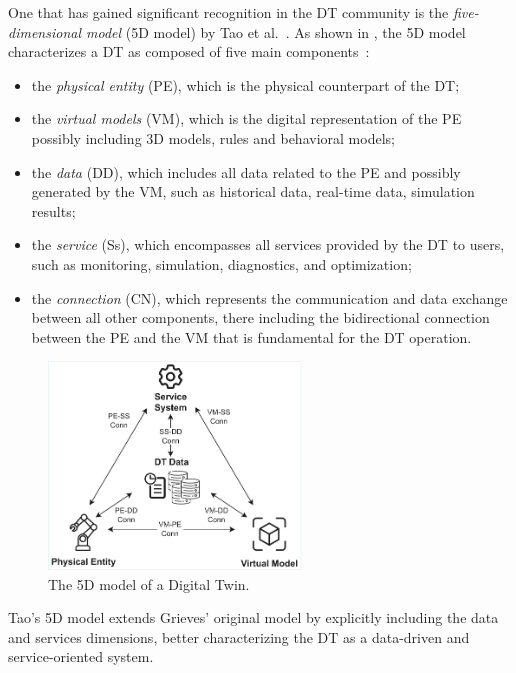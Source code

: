 One that has gained significant recognition in the \ac{DT} community is the \emph{five-dimensional model} (5D model) by Tao et al.~\cite{dt-driven-prognostics-tao-2018}.
%
As shown in , the 5D model characterizes a \ac{DT} as composed of five main components~\cite{qi2021enablingtechdt}:
\begin{itemize}
\item the \emph{physical entity} (PE), which is the physical counterpart of the \ac{DT};
\item the \emph{virtual models} (VM), which is the digital representation of the PE possibly including 3D models, rules and behavioral models;
\item the \emph{data} (DD), which includes all data related to the PE and possibly generated by the VM, such as historical data, real-time data, simulation results;
\item the \emph{service} (Ss), which encompasses all services provided by the \ac{DT} to users, such as monitoring, simulation, diagnostics, and optimization;
\item the \emph{connection} (CN), which represents the communication and data exchange between all other components, there including the bidirectional connection between the PE and the VM that is fundamental for the \ac{DT} operation.
\end{itemize}

\begin{figure}[ht]
    \centering
    \includegraphics[width=0.6\textwidth]{figures/5d-model.pdf}
    \caption{The 5D model of a Digital Twin.}
    \label{fig:dt-5d-model}
\end{figure}

Tao's 5D model extends Grieves' original model by explicitly including the data and services dimensions, better characterizing the \ac{DT} as a data-driven and service-oriented system. 


